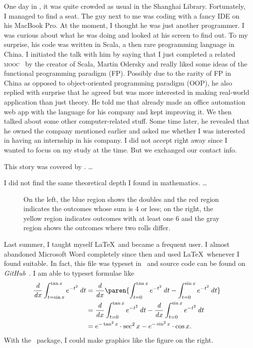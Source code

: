 	One day in , it was quite crowded as usual in the Shanghai Library. Fortunately, I
	managed to find a seat. The guy next to me was coding with a fancy IDE on his
	MacBook Pro. At the moment, I thought he was just another programmer. I was
	curious about what he was doing and looked at his screen to find out. To my
	surprise, his code was written in Scala, a then rare programming language in
	China. I initiated the talk with him by saying that I just completed a related
	\textsc{mooc}~\cite{FPPS} by the creator of Scala, Martin Odersky and really liked some
	ideas of the functional programming paradigm (FP). Possibly due to the rarity
	of FP in China as opposed to object-oriented programming paradigm (OOP), he
	also replied with surprise that he agreed but was more interested in making
	real-world application than just theory. He told me that already made an office
	automation web app with the language for his company and kept improving it. We
	then talked about some other computer-related stuff. Some time later, he
	revealed that he owned the company mentioned earlier and asked me whether I was
	interested in having an internship in his company. I did not accept right away
	since I wanted to focus on my study at the time. But we exchanged our contact
	info.
	
	This story was covered by . \dots %
	
	I did not find the same theoretical depth I found in mathematics.
	\dots
	
	\begin{wrapfigure}[8]{r}[.6in]{.4\textwidth}
		\scalebox{.4}{  }
		\caption{On the left, the blue region shows the doubles and the red region
			indicates the outcomes whose sum is 4 or less; on the right, the yellow region
			indicates outcomes with at least one 6 and the gray region shows the outcomes
			where two rolls differ.}
		\label{fig:CondProbEx}
	\end{wrapfigure}
	
	Last summer, I taught myself \LaTeX\ and became a frequent user. I almost
	abandoned Microsoft Word completely since then and used \LaTeX\ whenever I found
	suitable. In fact, this file was typeset in \LuaLaTeX\ and source code can be
	found on \textit{GitHub}~\cite{Readmission}. I am able to typeset formulae like
	\begin{align*}
	\dd x \int_{t=\sin x}^{\tan x} e^{-t^2} \dt
		&= \dd x \paren{\int_{t=0}^{\tan x} e^{-t^2} \dt -
			\int_{t=0}^{\sin x} e^{-t^2} \dt} \\
		&= \dd x \int_{t=0}^{\tan x} e^{-t^2} \dt
			- \dd x \int_{t=0}^{\sin x} e^{-t^2} \dt \\
		&= e^{-\tan^2 x} \cdot \sec^2 x - e^{-\sin^2 x} \cdot \cos x.
	\end{align*}
	With the \TikZ\ package, I could make graphics like the figure on the right.
	
